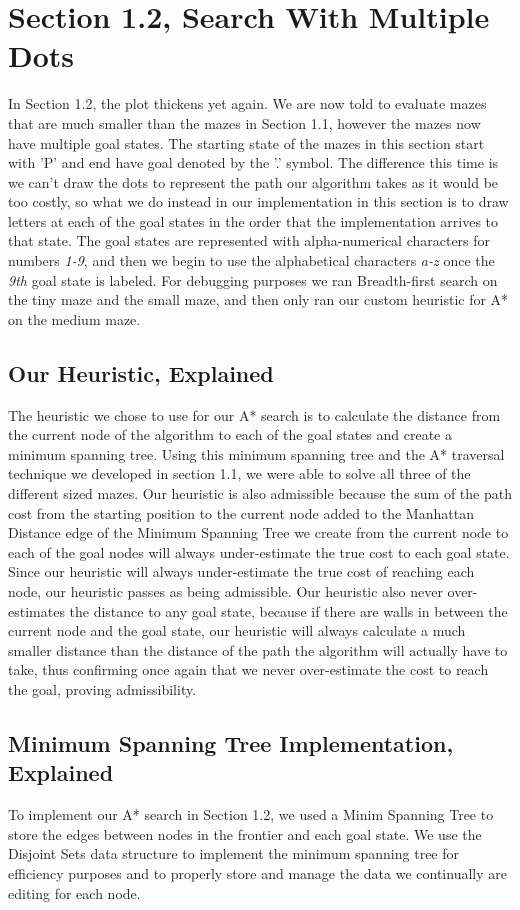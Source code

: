 \documentclass[titlepage]{article}
\begin{document}
\section{Section 1.2, Search With Multiple Dots} 
In Section 1.2, the plot thickens yet again. We are now told to evaluate mazes that are much smaller than the mazes in Section 1.1, however the mazes now have multiple goal states. The starting state of the mazes in this section start with 'P' and end have goal denoted by the '.' symbol. The difference this time is we can't draw the dots to represent the path our algorithm takes as it would be too costly, so what we do instead in our implementation in this section is to draw letters at each of the goal states in the order that the implementation arrives to that state. The goal states are represented with alpha-numerical characters for numbers \textit{1-9}, and then we begin to use the alphabetical characters \textit{a-z} once the \textit{9th} goal state is labeled. For debugging purposes we ran Breadth-first search on the tiny maze and the small maze, and then only ran our custom heuristic for A* on the medium maze. 

\subsection{Our Heuristic, Explained}
The heuristic we chose to use for our A* search is to calculate the distance from the current node of the algorithm to each of the goal states and create a minimum spanning tree. Using this minimum spanning tree and the A* traversal technique we developed in section 1.1, we were able to solve all three of the different sized mazes. Our heuristic is also admissible because the sum of the path cost from the starting position to the current node added to the Manhattan Distance edge of the Minimum Spanning Tree we create from the current node to each of the goal nodes will always under-estimate the true cost to each goal state. Since our heuristic will always under-estimate the true cost of reaching each node, our heuristic passes as being admissible. Our heuristic also never over-estimates the distance to any goal state, because if there are walls in between the current node and the goal state, our heuristic will always calculate a much smaller distance than the distance of the path the algorithm will actually have to take, thus confirming once again that we never over-estimate the cost to reach the goal, proving admissibility. 

\subsection{Minimum Spanning Tree Implementation, Explained}
To implement our A* search in Section 1.2, we used a Minim Spanning Tree to store the edges between nodes in the frontier and each goal state. We use the Disjoint Sets data structure to implement the minimum spanning tree for efficiency purposes and to properly store and manage the data we continually are editing for each node.
\end{document}
